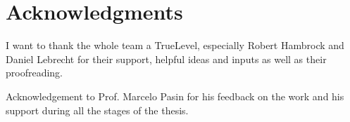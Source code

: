 \chapter*{Acknowledgments}

I want to thank the whole team a TrueLevel, especially Robert Hambrock and
Daniel Lebrecht for their support, helpful ideas and inputs as well as their
proofreading.

Acknowledgement to Prof. Marcelo Pasin for his feedback on the work and his
support during all the stages of the thesis.
